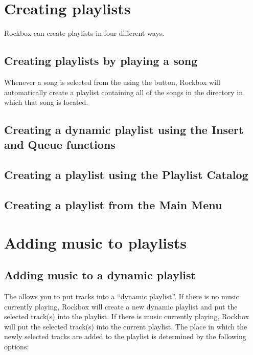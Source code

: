 \section{Creating playlists}

Rockbox can create playlists in four different ways. 

\subsection{Creating playlists by playing a song}

Whenever a song is selected from the  using the 
\ButtonSelect{} button, Rockbox will automatically create a playlist 
containing  all of the songs in the directory in which that song is located.


\subsection{Creating a dynamic playlist using the Insert and Queue functions}

\subsection{Creating a playlist using the Playlist Catalog}

\subsection{Creating a playlist from the Main Menu}

\section{Adding music to playlists}
  
\subsection{\label{ref:Playlistsubmenu}Adding music to a dynamic playlist} 
The  allows you to put tracks into a 
``dynamic playlist''. If there is no music currently playing, Rockbox will 
create a new dynamic playlist and put the selected track(s) into the 
playlist.  If there is music currently playing, Rockbox will put the 
selected track(s) into the current playlist.  The place in which the newly 
selected tracks are added to the playlist is determined by the following 
options:

